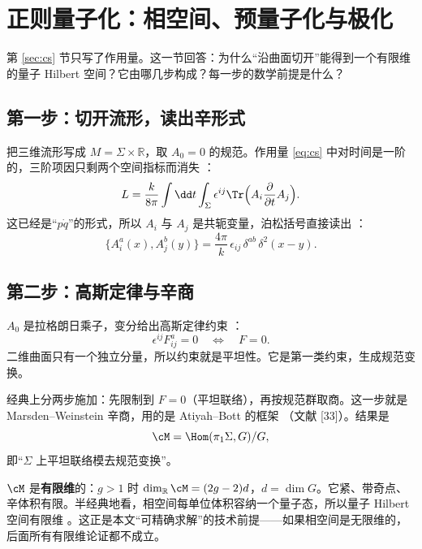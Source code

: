 \section{正则量子化：相空间、预量子化与极化}
\label{sec:canonical}

第 \ref{sec:cs} 节只写了作用量。这一节回答：为什么“沿曲面切开”能得到一个有限维的量子 Hilbert 空间？它由哪几步构成？每一步的数学前提是什么？

\subsection{第一步：切开流形，读出辛形式}

把三维流形写成 $M=\Sigma\times\mathbb{R}$，取 $A_0=0$ 的规范。作用量 \eqref{eq:cs} 中对时间是一阶的，三阶项因只剩两个空间指标而消失 ：
\begin{equation}
L=\frac{k}{8\pi}\int \dd t\int_\Sigma \epsilon^{ij}\Tr\Bigl(A_i\frac{\partial}{\partial t}A_j\Bigr).
\label{eq:sympl}
\end{equation}
这已经是“$p\dot q$”的形式，所以 $A_i$ 与 $A_j$ 是共轭变量，泊松括号直接读出 ：
\begin{equation}
\{A_i^a(x),A_j^b(y)\}=\frac{4\pi}{k}\,\epsilon_{ij}\,\delta^{ab}\,\delta^2(x-y).
\label{eq:poisson}
\end{equation}

\subsection{第二步：高斯定律与辛商}

$A_0$ 是拉格朗日乘子，变分给出高斯定律约束 ：
\begin{equation}
\epsilon^{ij}F^a_{ij}=0\quad\Longleftrightarrow\quad F=0 .
\label{eq:gauss}
\end{equation}
二维曲面只有一个独立分量，所以约束就是平坦性。它是第一类约束，生成规范变换。

经典上分两步施加：先限制到 $F=0$（平坦联络），再按规范群取商。这一步就是 Marsden--Weinstein 辛商，用的是 Atiyah--Bott 的框架 （文献 [33]）。结果是
\begin{equation}
\cM=\Hom(\pi_1\Sigma,G)/G ,
\end{equation}
即“$\Sigma$ 上平坦联络模去规范变换”。

\begin{keypoint}
$\cM$ 是\textbf{有限维}的：$g>1$ 时 $\dim_\mathbb{R}\cM=(2g-2)d$，$d=\dim G$。它紧、带奇点、辛体积有限。半经典地看，相空间每单位体积容纳一个量子态，所以量子 Hilbert 空间有限维 。这正是本文“可精确求解”的技术前提——如果相空间是无限维的，后面所有有限维论证都不成立。
\end{keypoint}

